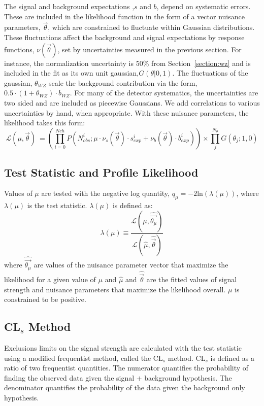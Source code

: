 The signal and background expectations ,$s$ and $b$, depend on systematic errors. These are included in the likelihood function in the form of a vector nuisance parameters, $\vec{\theta}$, which are constrained to fluctuate within Gaussian distributions. These fluctuations affect the background and signal expectations by response functions, $\nu(\vec{\theta})$, set by uncertainties measured in the previous section. For instance, the \WZ normalization uncertainty is 50\% from Section~\ref{section:wz} and is included in the fit as its own unit gaussian,$G(\theta|0,1)$. The fluctuations of the gaussian, $\theta_{WZ}$ scale the background contribution via the form, $0.5\cdot(1+\theta_{WZ})\cdot b_{WZ}$. For many of the detector systematics, the uncertainties are two sided and are included as piecewise Gaussians. We add correlations to various uncertainties by hand, when appropriate. With these nuisance parameters, the likelihood takes this form:
\begin{equation}
\mathcal{L}(\mu,\vec{\theta})\ =  \left( \prod_{i=0}^{N{ch}} P(N_{obs}^{i}; \mu \cdot \nu_{s}(\vec{\theta})\cdot s_{exp}^{i} + \nu_{b}(\vec{\theta})\cdot b_{exp}^{i}) \right) \times \prod_{j}^{N_{\theta}}G(\theta_j; 1,0)
\end{equation}


\subsection{Test Statistic and Profile Likelihood}

Values of $\mu$ are tested with the negative log quantity, $q_{\mu}= -2$ln$(\lambda(\mu))$, where $\lambda(\mu)$ is the test statistic.
$\lambda(\mu)$ is defined as:
\begin{equation}
\lambda(\mu) \equiv \frac{\mathcal{L}(\mu,\hat{\vec{\theta_{\mu}}})}{\mathcal{L}(\hat{\mu},\hat{\vec{\theta}})}
\end{equation}
where $\hat{\vec{\theta_{\mu}}}$ are values of the nuisance parameter vector that maximize the likelihood for a given value of $\mu$ and $\hat{\mu}$ and $\hat{\vec{\theta}}$ are the fitted values of signal strength and nuisance parameters that maximize the likelihood overall. $\mu$ is constrained to be positive.  

\subsection{ CL$_{s}$ Method}

Exclusions limits on the signal strength are calculated with the test statistic using a modified frequentist method, called the CL$_{s}$ method\cite{0954-3899-28-10-313}. CL$_{s}$ is defined as a ratio of two frequentist quantities. The numerator quantifies the probability of finding the observed data given the signal $+$ background hypothesis. The denominator quantifies the probability of the data given the background only hypothesis.


